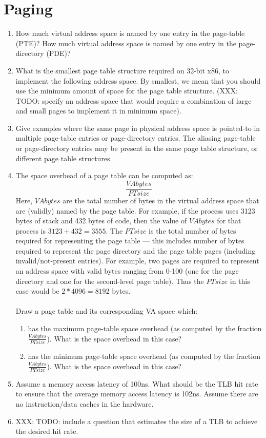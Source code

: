 \section{Paging}
\begin{enumerate}
\item How much virtual address space is named by one entry in the page-table (PTE)? How
much virtual address space is named by one entry in the page-directory (PDE)?
\item What is the smallest page table structure required on 32-bit
x86, to implement the following
address space. By smallest, we mean that you should use the minimum amount
of space for the page table structure. (XXX: TODO: specify an address space that would
require
a combination of large and small pages to implement it in minimum space).
\item Give examples where the same page in physical address space is pointed-to in
multiple page-table entries or page-directory entries. The aliasing
page-table or page-directory entries may be
present in the same page table structure, or different page table structures.
\item The space overhead of a page table can be computed as:
$$
\frac{VAbytes}{PTsize}
$$
Here, $VAbytes$ are the total number of bytes in the virtual address space that
are (validly) named by the page table. For example, if the process uses 3123 bytes of
stack and 432 bytes of code, then the value of $VAbytes$ for that process
is $3123+432=3555$. The $PTsize$ is the total number of bytes required for representing
the page table --- this includes number of bytes required to represent the page directory
and the page table pages (including invalid/not-present entries). For example,
two pages are required to represent an address space with valid
bytes ranging from 0-100 (one for the page directory and one for the second-level
page table). Thus the $PTsize$ in this case would be $2 * 4096 = 8192$ bytes.\\\\
Draw a page table and its corresponding VA space which:
\begin{enumerate}
\item has the maximum page-table space overhead (as computed by the fraction $\frac{VAbytes}{PTsize}$). What is the space overhead in this case?
\item has the minimum page-table space overhead (as computed by the fraction $\frac{VAbytes}{PTsize}$). What is the space overhead in this case?
\end{enumerate}
\item Assume a memory access latency of 100ns. What should be the TLB hit rate to ensure
that the average memory access latency is 102ns. Assume there are no instruction/data
caches in the hardware.
\item XXX: TODO: include a question that estimates the size of a TLB to achieve the
desired hit rate.
\end{enumerate}


